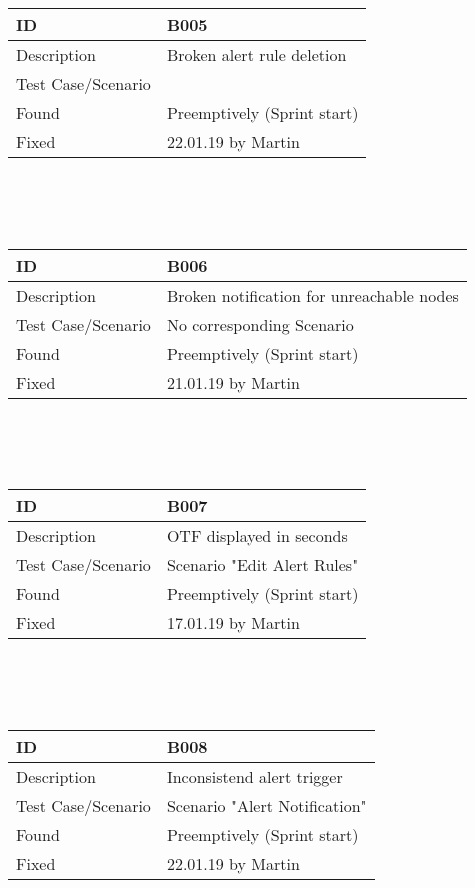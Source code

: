 \documentclass{scrreprt}
\begin{document}
	\\ \\ \\
	\begin{tabularx}{12cm}{l|X}
		ID					& B005  \\
		\hline
		Description 		& 
		Broken alert rule deletion \\
		\hline
		Test Case/Scenario	&  \\
		\hline
		Found				&  	Preemptively (Sprint start)\\
		\hline
		Fixed				&   22.01.19 by Martin \\ 
	\end{tabularx}
	\\ \\ \\
	\begin{tabularx}{12cm}{l|X}
		ID					& B006  \\
		\hline
		Description 		& 
   		Broken notification for unreachable nodes \\
		\hline
		Test Case/Scenario	& No corresponding Scenario\\
		\hline
		Found				&  	Preemptively (Sprint start)\\
		\hline
		Fixed				&   21.01.19 by Martin \\ 
	\end{tabularx}
\\ \\ \\
\begin{tabularx}{12cm}{l|X}
ID					& B007  \\
\hline
Description 		& 
OTF displayed in seconds \\
\hline
Test Case/Scenario	& Scenario "Edit Alert Rules"  \\
\hline
Found				&  	Preemptively (Sprint start)\\
\hline
Fixed				&   17.01.19 by Martin \\ 
\end{tabularx}
\\ \\ \\
\begin{tabularx}{12cm}{l|X}
ID					& B008  \\
\hline
Description 		& 
Inconsistend alert trigger \\
\hline
Test Case/Scenario	& Scenario "Alert Notification"\\
\hline
Found				&  	Preemptively (Sprint start)\\
\hline
Fixed				&  22.01.19 by Martin \\ 
\end{tabularx}
\end{document}
